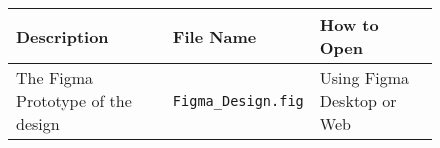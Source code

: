 
\begin{figure}[h]
    \centering
    \begin{tabular}{|p{6cm}|p{3.5cm}|p{5cm}|}
        \hline \textbf{Description} & \textbf{File Name} & \textbf{How to Open} \\ \hline
        The Figma Prototype of the design & \verb|Figma_Design.fig| & Using Figma Desktop or Web\\ \hline
    \end{tabular}
\end{figure}
